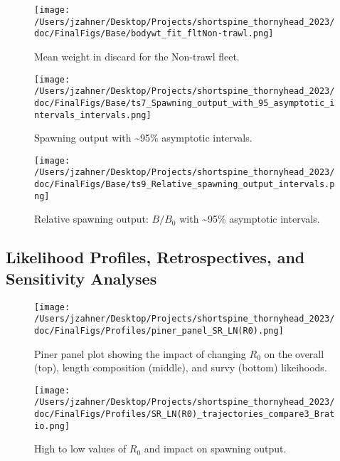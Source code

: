 \documentclass[11pt,
  english,
  letterpaper,
]{article}
\begin{document}
\begin{figure}
\centering
\texttt{[image: /Users/jzahner/Desktop/Projects/shortspine\_thornyhead\_2023/doc/FinalFigs/Base/bodywt\_fit\_fltNon-trawl.png]}
\caption{Mean weight in discard for the Non-trawl fleet.\label{fig:weightNonTrl}}
\end{figure}

\begin{figure}
\centering
\texttt{[image: /Users/jzahner/Desktop/Projects/shortspine\_thornyhead\_2023/doc/FinalFigs/Base/ts7\_Spawning\_output\_with\_95\_asymptotic\_intervals\_intervals.png]}
\caption{Spawning output with \textasciitilde95\% asymptotic intervals.\label{fig:spawnout}}
\end{figure}

\begin{figure}
\centering
\texttt{[image: /Users/jzahner/Desktop/Projects/shortspine\_thornyhead\_2023/doc/FinalFigs/Base/ts9\_Relative\_spawning\_output\_intervals.png]}
\caption{Relative spawning output: \(B/B_0\) with \textasciitilde95\% asymptotic intervals.\label{fig:relspawnout}}
\end{figure}

\clearpage

\hypertarget{likelihood-profiles-retrospectives-and-sensitivity-analyses}{%
\subsection{Likelihood Profiles, Retrospectives, and Sensitivity Analyses}\label{likelihood-profiles-retrospectives-and-sensitivity-analyses}}

\begin{figure}
\centering
\texttt{[image: /Users/jzahner/Desktop/Projects/shortspine\_thornyhead\_2023/doc/FinalFigs/Profiles/piner\_panel\_SR\_LN(R0).png]}
\caption{Piner panel plot showing the impact of changing \(R_0\) on the overall (top), length composition (middle), and survy (bottom) likeihoods.\label{fig:R0_prof}}
\end{figure}

\begin{figure}
\centering
\texttt{[image: /Users/jzahner/Desktop/Projects/shortspine\_thornyhead\_2023/doc/FinalFigs/Profiles/SR\_LN(R0)\_trajectories\_compare3\_Bratio.png]}
\caption{High to low values of \(R_0\) and impact on spawning output.\label{fig:R0_spawnout}}
\end{figure}
\end{document}
